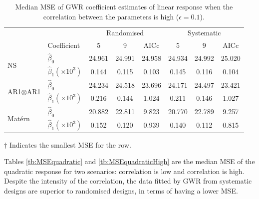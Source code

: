 \documentclass[a4paper]{article} 	%
\newcommand{\Matern}{Mat\'ern }
\begin{document}
\begin{table}[!htp]
	\centering
\begin{threeparttable}
	\caption{Median MSE of GWR coefficient estimates of linear response when the correlation between the parameters is high ($\epsilon=0.1$).}\label{tb:MSElinearHigh}
	\begin{tabular}{llcccccc}
		\toprule
		&  & \multicolumn{3}{c}{Randomised} & \multicolumn{3}{c}{Systematic} \\ 
		& Coefficient & 5  &  9  & AICc & 5   & 9  & AICc \\ \midrule
		\multirow{2}{*}{NS}   & $\hat{\beta}_0$  & 24.961	&24.991	&24.958	&24.934\tnote{$\dagger$}	&24.992	&25.020 \\
		& $\hat{\beta}_1 (\times 10^3)$ & 0.144&	0.115&	0.103\tnote{$\dagger$} &	0.145&	0.116&	0.104 \\ \midrule
		\multirow{2}{*}{AR1$\otimes$AR1}  & $\hat{\beta}_0$  & 24.234&	24.518&	23.696&	24.171	&24.497&	23.421\tnote{$\dagger$}  \\
		& $\hat{\beta}_1 (\times 10^3)$   & 0.216	&0.144\tnote{$\dagger$} &	1.024&	0.211&	0.146&	1.027 \\ \midrule
		\multirow{2}{*}{\Matern} & $\hat{\beta}_0$  & 20.882&	22.811&	9.823&	20.770	&22.789	&9.257\tnote{$\dagger$}  \\
		& $\hat{\beta}_1 (\times 10^3)$  & 0.152&	0.120&	0.939&	0.140&	0.112\tnote{$\dagger$} &	0.815 \\ 
		\bottomrule
	\end{tabular}
		\begin{tablenotes}
	\item[$\dagger$] \footnotesize Indicates the smallest MSE for the row.
	\end{tablenotes}
\end{threeparttable}
\end{table}


Tables \ref{tb:MSEquadratic} and \ref{tb:MSEquadraticHigh} are the median MSE of the quadratic response for two scenarios: correlation is low and correlation is high. Despite the intensity of the correlation, the data fitted by GWR from systematic designs are superior to randomised designs, in terms of having a lower MSE. 
\end{document}
